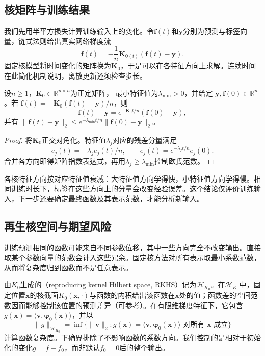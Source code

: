 \subsection{核矩阵与训练结果}

我们先用半平方损失计算训练输入上的变化。令$\bm f(t)$和$\bm y$分别为预测与标签向量，链式法则给出真实网络梯度流
\[
 \dot{\bm f}(t)=-\frac1n\bm K_{\bm\theta(t)}(\bm f(t)-\bm y).
\]
固定核模型将时间变化的矩阵换为$\bm K_0$，于是可以在各特征方向上求解。连续时间在此简化机制说明，离散更新还须检查步长。

\begin{theorem}[固定NTK下的训练收敛]
\label{thm:ntk-training-convergence}
设$n\geq1$，$\bm K_0\in\mathbb R^{n\times n}$为正定矩阵，
最小特征值为$\lambda_{\min}>0$，并给定
$\bm y,\bm f(0)\in\mathbb R^n$。若
$\dot{\bm f}(t)=-\bm K_0(\bm f(t)-\bm y)/n$，则
\[
 \bm f(t)-\bm y=e^{-\bm K_0t/n}(\bm f(0)-\bm y),
\]
并有
$\|\bm f(t)-\bm y\|_2\leq e^{-\lambda_{\min}t/n}\|\bm f(0)-\bm y\|_2$。
\end{theorem}
\begin{proof}
将$\bm K_0$正交对角化。特征值$\lambda_j$对应的残差分量满足
\[
 \dot e_j(t)=-\lambda_j e_j(t)/n,\qquad
 e_j(t)=e^{-\lambda_jt/n}e_j(0).
\]
合并各方向即得矩阵指数表达式，再用$\lambda_j\geq\lambda_{\min}$控制欧氏范数。
\end{proof}

各核特征方向按对应特征值衰减：大特征值方向学得快，小特征值方向学得慢。相同训练时长下，标签在这些方向上的分量会改变经验误差。这个结论仅评价训练输入，下一步还要确定最终函数及其表示范数，才能分析新输入。

\subsection{再生核空间与期望风险}
\label{sec:ntk-rkhs-generalization}

训练预测相同的函数可能来自不同参数位移，其中一些方向完全不改变输出。直接取某个参数向量的范数会计入这些冗余。固定核方法对所有表示取最小系数范数，从而将复杂度归到函数而不是任意表示。

由$K_0$生成的（reproducing kernel Hilbert space, RKHS）记为$\mathcal H_{K_0}$。在$\mathcal H_{K_0}$中，固定位置$\bm x$的核截面$K_0(\bm x,\cdot)$与函数的内积给出该函数在$\bm x$处的值；函数差的空间范数因而能够控制该位置的预测差异（可参考）。在有限维梯度特征下，它包含$g(\bm x)=\langle\bm v,\bm\varphi_0(\bm x)\rangle$，并以
\[
 \|g\|_{\mathcal H_{K_0}}
 =\inf\{\|\bm v\|_2:g(\bm x)=\langle\bm v,\bm\varphi_0(\bm x)\rangle
                         \text{ 对所有 }\bm x\text{ 成立}\}
\]
计算函数复杂度。下确界排除了不影响函数的系数方向。我们控制的是相对于初始化的变化$g=f-f_0$，而非默认$f_0=0$后的整个输出。

